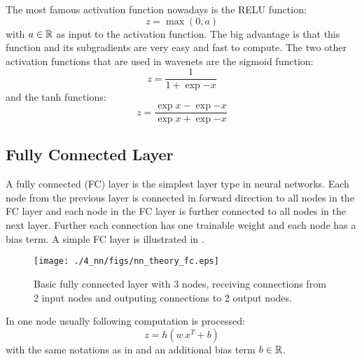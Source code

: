 The most famous activation function nowadays is the RELU function:
\begin{equation}\label{eq:nn_theory_relu}
  z = \max{(0, a)}
\end{equation}
with $a \in \mathbb{R}$ as input to the activation function.
The big advantage is that this function and its subgradients are very easy and fast to compute.
The two other activation functions that are used in wavenets are the sigmoid function:
\begin{equation}\label{eq:nn_theory_sigmoid}
  z = \frac{1}{1 + \exp{-x}}
\end{equation}
and the tanh functions:
\begin{equation}\label{eq:nn_theory_tanh}
  z = \frac{\exp{x} - \exp{-x}}{\exp{x} + \exp{-x}}
\end{equation}



\subsection{Fully Connected Layer}
A fully connected (FC) layer is the simplest layer type in neural networks.
Each node from the previous layer is connected in forward direction to all nodes in the FC layer and each node in the FC layer is further connected to all nodes in the next layer.
Further each connection has one trainable weight and each node has a bias term.
A simple FC layer is illustrated in .
\begin{figure}[!ht]
  \centering
    \texttt{[image: ./4\_nn/figs/nn\_theory\_fc.eps]}
  \caption{Basic fully connected layer with 3 nodes, receiving connections from 2 input nodes and outputing connections to 2 output nodes.}
  \label{fig:nn_theory_fc}
\end{figure}
\FloatBarrier
\noindent
In one node usually following computation is processed:
\begin{equation}
  z = h(w \, x^T + b)
\end{equation}
with the same notations as in  and an additional bias term $b \in \mathbb{R}$.



